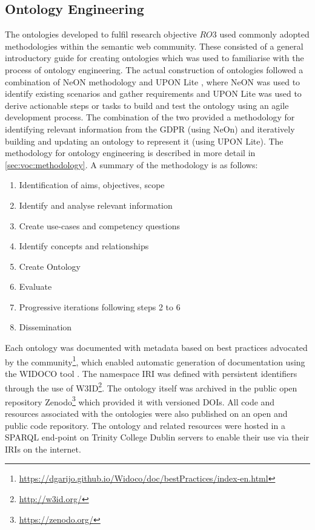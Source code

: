 \subsection{Ontology Engineering}\label{sec:intro:ontology-engineering}
The ontologies developed to fulfil research objective $RO3$ used commonly adopted methodologies within the semantic web community. These consisted of a general introductory guide for creating ontologies \cite{noy_ontology_2001} which was used to familiarise with the process of ontology engineering.
The actual construction of ontologies followed a combination of NeON methodology \cite{suarez-figueroa_neon_2012} and UPON Lite \cite{de_nicola_lightweight_2016}, where NeON was used to identify existing scenarios and gather requirements and UPON Lite was used to derive actionable steps or tasks to build and test the ontology using an agile development process.
The combination of the two provided a methodology for identifying relevant information from the GDPR (using NeOn) and iteratively building and updating an ontology to represent it (using UPON Lite).
The methodology for ontology engineering is described in more detail in \autoref{sec:voc:methodology}.
A summary of the methodology is as follows:
\begin{enumerate}
	\item Identification of aims, objectives, scope
    \item Identify and analyse relevant information
    \item Create use-cases and competency questions
    \item Identify concepts and relationships
    \item Create Ontology
    \item Evaluate
    \item Progressive iterations following steps 2 to 6
    \item Dissemination
\end{enumerate}

Each ontology was documented with metadata based on best practices advocated by the community\footnote{\url{https://dgarijo.github.io/Widoco/doc/bestPractices/index-en.html}}, which enabled automatic generation of documentation using the WIDOCO tool \cite{garijo_widoco_2017}.
The namespace IRI was defined with persistent identifiers through the use of W3ID\footnote{\url{http://w3id.org/}}.
The ontology itself was archived in the public open repository Zenodo\footnote{\url{https://zenodo.org/}} which provided it with versioned DOIs.
All code and resources associated with the ontologies were also published on an open and public code repository.
The ontology and related resources were hosted in a SPARQL end-point on Trinity College Dublin servers to enable their use via their IRIs on the internet.

